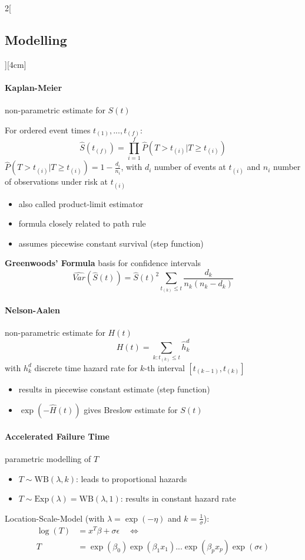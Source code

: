 \documentclass[8pt]{extarticle}
\begin{document}
\begin{multicols}{2}[\subsection{Modelling}][4cm] 

\paragraph{Kaplan-Meier} non-parametric estimate for $S(t)$

\noindent For ordered event times $t_{(1)}, ..., t_{(f)}$:
$$\hat{S}\left(t_{(f)}\right) = \prod_{i=1}^f \hat{P}\left(T>t_{(i)}|T\geq t_{(i)}\right)$$
$\hat{P}\left(T>t_{(i)}|T\geq t_{(i)}\right) = 1-\frac{d_i}{n_i}$, with $d_i$ number of events at $t_{(i)}$  and $n_i$ number of observations under risk at $t_{(i)}$
\begin{itemize}[itemsep=-0.5em]
\item also called product-limit estimator 
\item formula closely related to path rule
\item assumes piecewise constant survival (step function)
\end{itemize}

\textbf{Greenwoods' Formula} basis for confidence intervals
$$\widehat{Var}\left(\hat{S}(t)\right) = \hat{S}(t)^2\sum_{t_{(k)} \leq t} \frac{d_k}{n_k(n_k-d_k)}$$
\paragraph{Nelson-Aalen} non-parametric estimate for $H(t)$
$$H(t) = \sum_{k:t_{(k)} \leq t} \hat{h}_k^d$$
\noindent with $h_k^d$ discrete time hazard rate for $k$-th interval $\left[t_{(k-1)}, t_{(k)}\right]$
\begin{itemize}[itemsep=-0.5em]
\item results in piecewise constant estimate (step function)
\item $\exp\left(-\hat{H}(t)\right)$ gives Breslow estimate for $S(t)$
\end{itemize}

\paragraph{Accelerated Failure Time} parametric modelling of $T$ 
\begin{itemize}[itemsep=-0.5em]
\item[] $T\sim \mathrm{WB}(\lambda, k)$: leads to proportional hazards
\item[] $T\sim \mathrm{Exp}(\lambda) = \mathrm{WB}(\lambda, 1)$: results in constant hazard rate
\end{itemize}
Location-Scale-Model (with $\lambda=\exp(-\eta)$ and $k=\frac{1}{\sigma}$): 
\begin{align*}
\log(T) &= x^T\beta + \sigma\epsilon \hspace{1em} \Longleftrightarrow \\
T &= \exp(\beta_0)\exp(\beta_1x_1)...\exp(\beta_px_p)\exp(\sigma\epsilon)
\end{align*}


\end{multicols}
\end{document}
